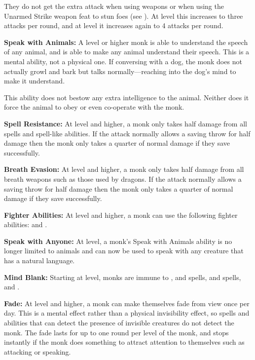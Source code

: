 \begin{multicols*}{2}
They do not get the extra attack when using weapons or when using the Unarmed Strike weapon feat to stun foes (see ). At  level this increases to three attacks per round, and at  level it increases again to 4 attacks per round.

\textbf{Speak with Animals:} A  level or higher monk is able to understand the speech of any animal, and is able to make any animal understand their speech. This is a mental ability, not a physical one. If conversing with a dog, the monk does not actually growl and bark but talks normally—reaching into the dog’s mind to make it understand.

This ability does not bestow any extra intelligence to the animal. Neither does it force the animal to obey or even co-operate with the monk.

\textbf{Spell Resistance:} At  level and higher, a monk only takes half damage from all spells and spell-like abilities. If the attack normally allows a saving throw for half damage then the monk only takes a quarter of normal damage if they save successfully.

\textbf{Breath Evasion:} At  level and higher, a monk only takes half damage from all breath weapons such as those used by dragons. If the attack normally allows a saving throw for half damage then the monk only takes a quarter of normal damage if they save successfully.

\textbf{Fighter Abilities:} At  level and higher, a monk can use the following fighter abilities:  and .

\textbf{Speak with Anyone:} At  level, a monk’s Speak with Animals ability is no longer limited to animals and can now be used to speak with any creature that has a natural language.

\textbf{Mind Blank:} Starting at  level, monks are immune to ,  and  spells,  and  spells, and .

\textbf{Fade:} At  level and higher, a monk can make themselves fade from view once per day. This is a mental effect rather than a physical invisibility effect, so spells and abilities that can detect the presence of invisible creatures do not detect the monk. The fade lasts for up to one round per level of the monk, and stops instantly if the monk does something to attract attention to themselves such as attacking or speaking.


\end{multicols*}
